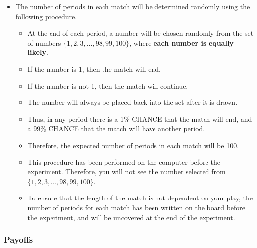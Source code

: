 \documentclass[11pt]{article}
\newcommand{\dblbkt}[1]{}
\begin{document}
\begin{itemize} 
\item The number of periods in each match will be determined randomly using the following procedure.  
\begin{itemize} 
  \item At the end of each period, \dblbkt{1}a number will be chosen randomly from the set of numbers \dblbkt{1} $ \{1,2,3,\ldots, 98, 99, 100\}$, where {\bf each number is equally likely}.  
  \item \dblbkt{1}If the number is 1, then the match will end.
  \item \dblbkt{1}If the number is not 1, then the match will continue.
  \item The number will always be placed back into the set after it is drawn.  
  \item Thus, in any period there is a 1\% CHANCE that the match will end, and a 99\% CHANCE that the match will have another period.
  \item Therefore, \dblbkt{1}the expected number of periods in each match will be 100.
  \item \dblbkt{2}This procedure has been performed on the computer before the experiment. Therefore, you will not see the number selected from $ \{1,2,3,\ldots, 98, 99, 100\}$.
  \item To ensure that the length of the match is not dependent on your play, the number of periods for each match has been written on the board before the experiment, and will be uncovered at the end of the experiment.  
\end{itemize} 
\end{itemize}



\subsubsection*{\dblbkt{3} Payoffs} 
\end{document}
